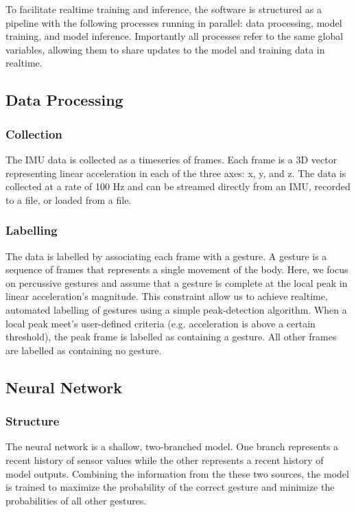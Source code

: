 \documentclass{article}
\begin{document}
To facilitate realtime training and inference, the software is structured as a pipeline with the following processes running in parallel: data processing, model training, and model inference. Importantly all processes refer to the same global variables, allowing them to share updates to the model and training data in realtime.

\subsection{Data Processing}
\subsubsection{Collection}
The IMU data is collected as a timeseries of frames. Each frame is a 3D vector representing linear acceleration in each of the three axes: x, y, and z. The data is collected at a rate of 100 Hz and can be streamed directly from an IMU, recorded to a file, or loaded from a file.

\subsubsection{Labelling}
The data is labelled by associating each frame with a gesture. A gesture is a sequence of frames that represents a single movement of the body. Here, we focus on percussive gestures and assume that a gesture is complete at the local peak in linear acceleration's magnitude. This constraint allow us to achieve realtime, automated labelling of gestures using a simple peak-detection algorithm. When a local peak meet's user-defined criteria (e.g. acceleration is above a certain threshold), the peak frame is labelled as containing a gesture. All other frames are labelled as containing no gesture.

\subsection{Neural Network}
\subsubsection{Structure}
The neural network is a shallow, two-branched model. One branch represents a recent history of sensor values while the other represents a recent history of model outputs. Combining the information from the these two sources, the model is trained to maximize the probability of the correct gesture and minimize the probabilities of all other gestures.
\end{document}
